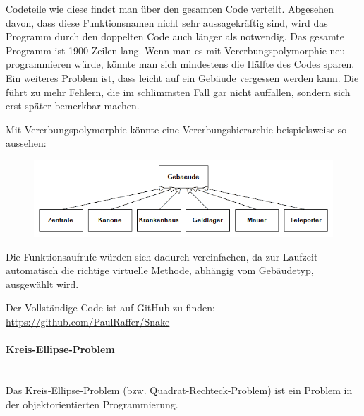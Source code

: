 				Codeteile wie diese findet man über den gesamten Code verteilt. Abgesehen davon, dass diese
				Funktionsnamen nicht sehr aussagekräftig sind, wird das Programm durch den doppelten Code
				auch länger als notwendig. Das gesamte Programm ist 1900 Zeilen lang. Wenn man es mit
				Vererbungspolymorphie neu programmieren würde, könnte man sich mindestens die Hälfte des Codes sparen.
				Ein weiteres Problem ist, dass leicht auf ein Gebäude vergessen werden kann. Die führt zu mehr Fehlern,
				die im schlimmsten Fall gar nicht auffallen, sondern sich erst später bemerkbar machen.
				
				Mit Vererbungspolymorphie könnte eine Vererbungshierarchie beispielsweise so aussehen:
				\begin{figure}[H]
					\includegraphics[width=\textwidth]{polymorphie/universell/vererbung/beispiele/snake/gebaeude.png}
				\end{figure}
				
				Die Funktionsaufrufe würden sich dadurch vereinfachen, da zur Laufzeit automatisch die richtige virtuelle
				Methode, abhängig vom Gebäudetyp, ausgewählt wird.
				\UseRawInputEncoding{}
				
				Der Vollständige Code ist auf GitHub zu finden: \url{https://github.com/PaulRaffer/Snake}
				
			\paragraph{Kreis-Ellipse-Problem}\mbox{}\\
				Das Kreis-Ellipse-Problem (bzw. Quadrat-Rechteck-Problem) ist ein Problem in der objektorientierten
				Programmierung.
				
